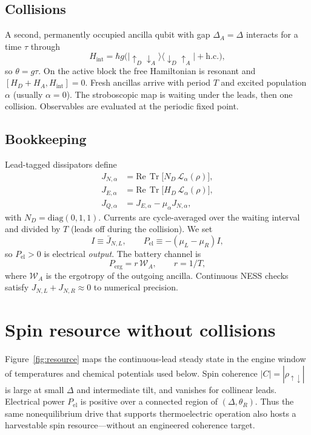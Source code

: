 \documentclass[aps,pre,twocolumn,floatfix,groupedaddress,amsmath,amssymb,nofootinbib]{revtex4-2}
\newcommand{\ket}[1]{\lvert #1\rangle}
\newcommand{\bra}[1]{\langle #1\rvert}
\newcommand{\Tr}{\operatorname{Tr}}
\newcommand{\W}{\mathcal{W}}
\begin{document}
\subsection{Collisions}

A second, permanently occupied ancilla qubit with gap $\Delta_A=\Delta$
interacts for a time $\tau$ through
\begin{equation}
H_{\mathrm{int}}=\hbar g\bigl(
\ket{\uparrow_D\downarrow_A}\bra{\downarrow_D\uparrow_A}+\mathrm{h.c.}\bigr),
\end{equation}
so $\theta=g\tau$. On the active block the free Hamiltonian is resonant and
$[H_D+H_A,H_{\mathrm{int}}]=0$. Fresh ancillas arrive with period $T$ and
excited population $\alpha$ (usually $\alpha=0$). The stroboscopic map is
waiting under the leads, then one collision. Observables are evaluated at
the periodic fixed point.

\subsection{Bookkeeping}

Lead-tagged dissipators define
\begin{align}
J_{N,\alpha}&=\mathrm{Re}\,\Tr\!\big[N_D\,\mathcal L_\alpha(\rho)\big],\\
J_{E,\alpha}&=\mathrm{Re}\,\Tr\!\big[H_D\,\mathcal L_\alpha(\rho)\big],\\
J_{Q,\alpha}&=J_{E,\alpha}-\mu_\alpha J_{N,\alpha},
\end{align}
with $N_D=\mathrm{diag}(0,1,1)$. Currents are cycle-averaged over the
waiting interval and divided by $T$ (leads off during the collision). We
set
\begin{equation}
I\equiv \bar J_{N,L},\qquad
P_{\mathrm{el}}\equiv -(\mu_L-\mu_R)I,
\end{equation}
so $P_{\mathrm{el}}>0$ is electrical \emph{output}. The battery channel is
\begin{equation}
P_{\mathrm{erg}}=r\,\W_A,\qquad r=1/T,
\end{equation}
where $\W_A$ is the ergotropy of the outgoing ancilla. Continuous NESS
checks satisfy $J_{N,L}+J_{N,R}\approx0$ to numerical precision.

\section{Spin resource without collisions}

Figure~\ref{fig:resource} maps the continuous-lead steady state in the
engine window of temperatures and chemical potentials used below. Spin
coherence $|C|=|\rho_{\uparrow\downarrow}|$ is large at small $\Delta$ and
intermediate tilt, and vanishes for collinear leads. Electrical power
$P_{\mathrm{el}}$ is positive over a connected region of $(\Delta,\theta_R)$.
Thus the same nonequilibrium drive that supports thermoelectric operation
also hosts a harvestable spin resource---without an engineered coherence
target.
\end{document}
